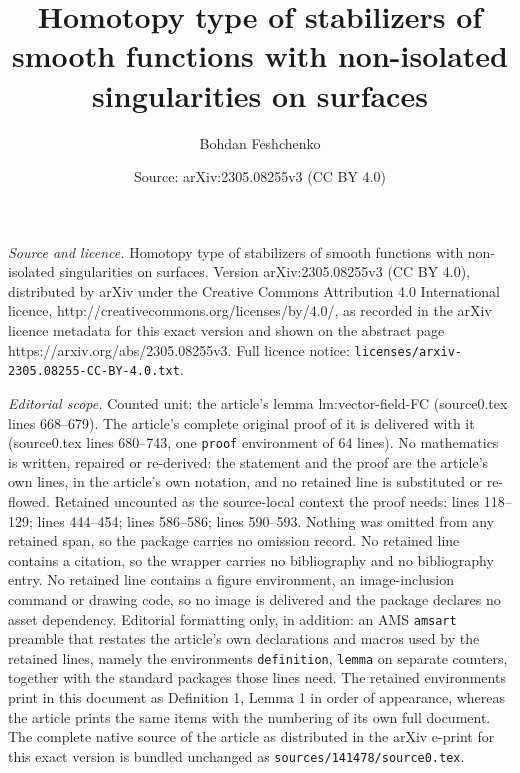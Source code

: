 \documentclass[10pt,a4paper]{amsart}
\title{Homotopy type of stabilizers of smooth functions with non-isolated singularities on surfaces}
\author{Bohdan Feshchenko}
\date{Source: arXiv:2305.08255v3 (CC BY 4.0)}
\begin{document}
\maketitle

\noindent\emph{Source and licence.} Homotopy type of stabilizers of smooth functions with non-isolated singularities on surfaces. Version arXiv:2305.08255v3 (CC BY 4.0), distributed by arXiv under the Creative Commons Attribution 4.0 International licence, http://creativecommons.org/licenses/by/4.0/, as recorded in the arXiv licence metadata for this exact version and shown on the abstract page https://arxiv.org/abs/2305.08255v3. Full licence notice: \texttt{licenses/arxiv-2305.08255-CC-BY-4.0.txt}.\par\smallskip

\noindent\textit{Editorial scope.} Counted unit: the article's lemma lm:vector-field-FC (source0.tex lines 668--679). The article's complete original proof of it is delivered with it (source0.tex lines 680--743, one \texttt{proof} environment of 64 lines). No mathematics is written, repaired or re-derived: the statement and the proof are the article's own lines, in the article's own notation, and no retained line is substituted or re-flowed.  Retained uncounted as the source-local context the proof needs: lines 118--129; lines 444--454; lines 586--586; lines 590--593.  Nothing was omitted from any retained span, so the package carries no omission record.  No retained line contains a citation, so the wrapper carries no bibliography and no bibliography entry.  No retained line contains a figure environment, an image-inclusion command or drawing code, so no image is delivered and the package declares no asset dependency.  Editorial formatting only, in addition: an AMS \texttt{amsart} preamble that restates the article's own declarations and macros used by the retained lines, namely the environments \texttt{definition}, \texttt{lemma} on separate counters, together with the standard packages those lines need.  The retained environments print in this document as Definition 1, Lemma 1 in order of appearance, whereas the article prints the same items with the numbering of its own full document.  The complete native source of the article as distributed in the arXiv e-print for this exact version is bundled unchanged as \texttt{sources/141478/source0.tex}.
\end{document}
